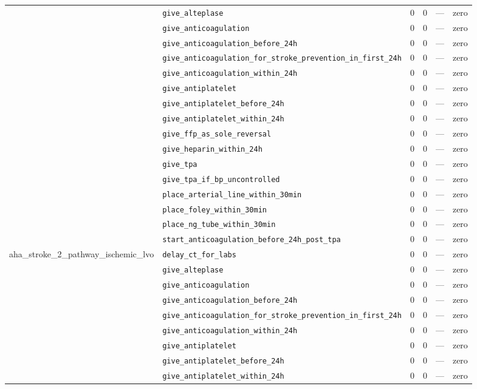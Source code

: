 \begin{table}[ht]
\begin{tabular}{llrrrl}
 & \texttt{give\_alteplase} & 0 & 0 & — & zero \\
 & \texttt{give\_anticoagulation} & 0 & 0 & — & zero \\
 & \texttt{give\_anticoagulation\_before\_24h} & 0 & 0 & — & zero \\
 & \texttt{give\_anticoagulation\_for\_stroke\_prevention\_in\_first\_24h} & 0 & 0 & — & zero \\
 & \texttt{give\_anticoagulation\_within\_24h} & 0 & 0 & — & zero \\
 & \texttt{give\_antiplatelet} & 0 & 0 & — & zero \\
 & \texttt{give\_antiplatelet\_before\_24h} & 0 & 0 & — & zero \\
 & \texttt{give\_antiplatelet\_within\_24h} & 0 & 0 & — & zero \\
 & \texttt{give\_ffp\_as\_sole\_reversal} & 0 & 0 & — & zero \\
 & \texttt{give\_heparin\_within\_24h} & 0 & 0 & — & zero \\
 & \texttt{give\_tpa} & 0 & 0 & — & zero \\
 & \texttt{give\_tpa\_if\_bp\_uncontrolled} & 0 & 0 & — & zero \\
 & \texttt{place\_arterial\_line\_within\_30min} & 0 & 0 & — & zero \\
 & \texttt{place\_foley\_within\_30min} & 0 & 0 & — & zero \\
 & \texttt{place\_ng\_tube\_within\_30min} & 0 & 0 & — & zero \\
 & \texttt{start\_anticoagulation\_before\_24h\_post\_tpa} & 0 & 0 & — & zero \\
\midrule
aha\_stroke\_2\_pathway\_ischemic\_lvo & \texttt{delay\_ct\_for\_labs} & 0 & 0 & — & zero \\
 & \texttt{give\_alteplase} & 0 & 0 & — & zero \\
 & \texttt{give\_anticoagulation} & 0 & 0 & — & zero \\
 & \texttt{give\_anticoagulation\_before\_24h} & 0 & 0 & — & zero \\
 & \texttt{give\_anticoagulation\_for\_stroke\_prevention\_in\_first\_24h} & 0 & 0 & — & zero \\
 & \texttt{give\_anticoagulation\_within\_24h} & 0 & 0 & — & zero \\
 & \texttt{give\_antiplatelet} & 0 & 0 & — & zero \\
 & \texttt{give\_antiplatelet\_before\_24h} & 0 & 0 & — & zero \\
 & \texttt{give\_antiplatelet\_within\_24h} & 0 & 0 & — & zero \\

\end{tabular}
\end{table}
